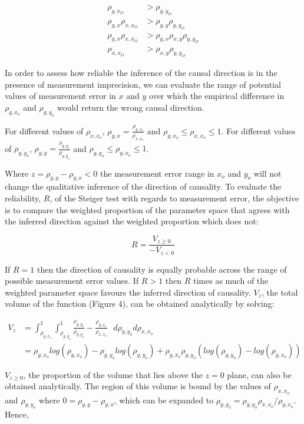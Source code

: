 \documentclass[]{article}
\begin{document}
\[
\begin{aligned}
\rho_{g, x_O} & > \rho_{g, y_O} \\
\rho_{g, x} \rho_{x, x_O} & > \rho_{g,y}\rho_{y,y_O}\\
\rho_{g, x} \rho_{x, x_O} & > \rho_{g,x}\rho_{x,y}\rho_{y,y_O}\\
\rho_{x, x_O} & > \rho_{x,y}\rho_{y,y_O}
\end{aligned}
\]

In order to assess how reliable the inference of the causal direction is
in the presence of measurement imprecision, we can evaluate the range of
potential values of measurement error in \(x\) and \(y\) over which the
empirical difference in \(\rho_{g, x_o}\) and \(\rho_{g, y_o}\) would
return the wrong causal direction.

For different values of \(\rho_{x,x_o}\),
\(\rho_{g,x} = \frac{\rho_{g, x_o}}{\rho_{x,x_o}}\) and
\(\rho_{g,x_o} \leq \rho_{x,x_o} \leq 1\). For different values of
\(\rho_{y,y_o}\), \(\rho_{g,y} = \frac{\rho_{g, y_o}}{\rho_{y,y_o}}\)
and \(\rho_{g,y_o} \leq \rho_{y,x_o} \leq 1\).

Where \(z = \rho_{g,y} - \rho_{g,x} < 0\) the measurement error range in
\(x_o\) and \(y_o\) will not change the qualitative inference of the
direction of causality. To evaluate the reliability, \(R\), of the
Steiger test with regards to measurement error, the objective is to
compare the weighted proportion of the parameter space that agrees with
the inferred direction against the weighted proportion which does not:

\[
R = \frac{V_{z \geq 0}}{ - V_{z < 0} }
\]

If \(R=1\) then the direction of causality is equally probable across
the range of possible measurement error values. If \(R > 1\) then \(R\)
times as much of the weighted parameter space favours the inferred
direction of causality. \(V_{z}\), the total volume of the function
(Figure 4), can be obtained analytically by solving:

\[
\begin{aligned}
V_z & = \int^1_{\rho_{g,x_o}} \int^1_{\rho_{g,y_o}} \frac{\rho_{g,y_o}}{\rho_{y,y_o}} - \frac{\rho_{g,x_o}}{\rho_{x,x_o}}\,\,\,\, d\rho_{y,y_o}d\rho_{x,x_o} \\
& = \rho_{g,x_o}log(\rho_{g,x_o}) - \rho_{g,y_o}log(\rho_{g,y_o}) + \rho_{g,x_o}\rho_{g,y_o}(log(\rho_{g,y_o})-log(\rho_{g,x_o}))
\end{aligned}
\]

\(V_{z \ge 0}\), the proportion of the volume that lies above the
\(z=0\) plane, can also be obtained analytically. The region of this
volume is bound by the values of \(\rho_{x,x_o}\) and \(\rho_{y,y_o}\)
where \(0 = \rho_{g,y} - \rho_{g,x}\), which can be expanded to
\(\rho_{y,y_o} = \rho_{g,y_o}\rho_{x,x_o} / \rho_{g,x_o}\). Hence,
\end{document}
